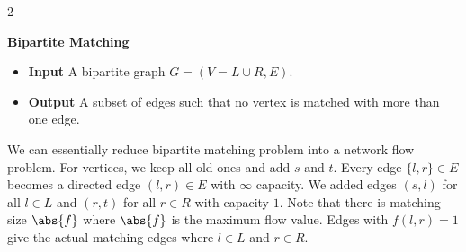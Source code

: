 \begin{multicols}{2}
\begin{leftbar}
    \textbf{Bipartite Matching}
    \begin{itemize}
        \item \textbf{Input} A bipartite graph $G = (V = L \cup R, E)$. 
        \item \textbf{Output} A subset of edges such that no vertex is matched with more than one edge. 
    \end{itemize}
\end{leftbar}
We can essentially reduce bipartite matching problem into a network flow problem. For vertices, we keep all old ones and add $s$ and $t$. Every edge $\{l, r\} \in E$ becomes a directed edge $(l,r) \in E$ with $\infty$ capacity. We added edges $(s,l)$ for all $l \in L$ and $(r, t)$ for all $r \in R$ with capacity $1$. Note that there is matching size $\abs{f}$ where $\abs{f}$ is the maximum flow value. Edges with $f(l,r) = 1$ give the actual matching edges where $l \in L$ and $r\in R$. 
\end{multicols}